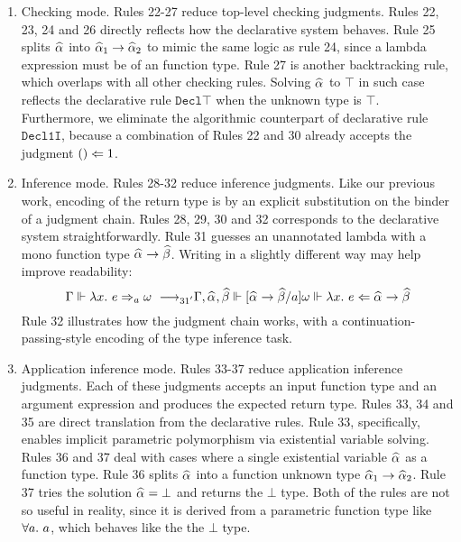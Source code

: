 \begin{enumerate}
    \item Checking mode. Rules 22-27 reduce top-level checking judgments.
            Rules 22, 23, 24 and 26 directly reflects how the declarative system behaves.
            Rule 25 splits $\al$ into $\al[1] \to \al[2]$ to mimic the same logic as rule 24,
            since a lambda expression must be of an function type.
            Rule 27 is another backtracking rule, which overlaps with all other checking rules.
            Solving $\al$ to $\top$ in such case reflects
            the declarative rule $\mathtt{Decl{\top}}$ when the unknown type is $\top$.
            Furthermore, we eliminate the algorithmic counterpart of declarative rule
            $\mathtt{Decl1I}$, because a combination of Rules 22 and 30 already
            accepts the judgment $() \Leftarrow 1$.
    
    \item Inference mode. Rules 28-32 reduce inference judgments.
            Like our previous work, encoding of the return type is by
            an explicit substitution on the binder of a judgment chain.
            Rules 28, 29, 30 and 32 corresponds to the declarative system straightforwardly.
            Rule 31 guesses an unannotated lambda with a mono function type $\al \to \bt$.
            Writing in a slightly different way may help improve readability:
            \[ \Gm \Vdash \lam e \To_a \jg \rrule{31'}
                \Gm, \al, \bt \Vdash [\al \to \bt / a]\jg \Vdash \lam e \Lto \al \to \bt \]
            Rule 32 illustrates how the judgment chain works, with a continuation-passing-style
            encoding of the type inference task.
    
    \item Application inference mode. Rules 33-37 reduce application inference judgments.
            Each of these judgments accepts an input function type and an argument expression
            and produces the expected return type.
            Rules 33, 34 and 35 are direct translation from the declarative rules.
            Rule 33, specifically, enables implicit parametric polymorphism via
            existential variable solving.
            Rules 36 and 37 deal with cases where a single existential variable
            $\al$ as a function type.
            Rule 36 splits $\al$ into a function unknown type $\al[1] \to \al[2]$.
            Rule 37 tries the solution $\al = \bot$ and returns the $\bot$ type.
            Both of the rules are not so useful in reality,
            since it is derived from a parametric function type like $\all a$,
            which behaves like the the $\bot$ type.


\end{enumerate}

